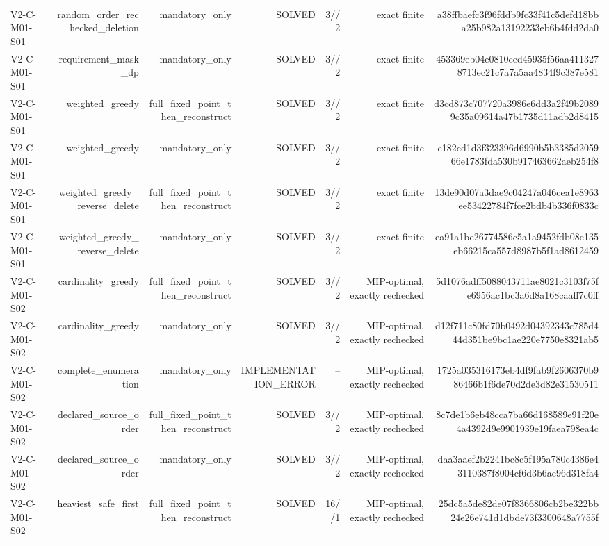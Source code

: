 {\begin{longtable}{lrrrrrr}
V2-C-M01-S01 & random\_order\_rechecked\_deletion & mandatory\_only & SOLVED & 3//2 & exact finite & a38ffbaefc3f96fddb9fc33f41c5defd18bba25b982a13192233eb6b4fdd2da0 \\
V2-C-M01-S01 & requirement\_mask\_dp & mandatory\_only & SOLVED & 3//2 & exact finite & 453369eb04e0810ced45935f56aa4113278713ec21c7a7a5aa4834f9c387e581 \\
V2-C-M01-S01 & weighted\_greedy & full\_fixed\_point\_then\_reconstruct & SOLVED & 3//2 & exact finite & d3cd873c707720a3986e6dd3a2f49b20899c35a09614a47b1735d11adb2d8415 \\
V2-C-M01-S01 & weighted\_greedy & mandatory\_only & SOLVED & 3//2 & exact finite & e182cd1d3f323396d6990b5b3385d205966e1783fda530b917463662aeb254f8 \\
V2-C-M01-S01 & weighted\_greedy\_reverse\_delete & full\_fixed\_point\_then\_reconstruct & SOLVED & 3//2 & exact finite & 13de90d07a3dae9c04247a046cea1e8963ee53422784f7fce2bdb4b336f0833c \\
V2-C-M01-S01 & weighted\_greedy\_reverse\_delete & mandatory\_only & SOLVED & 3//2 & exact finite & ea91a1be26774586c5a1a9452fdb08e135eb66215ca557d8987b5f1ad8612459 \\
V2-C-M01-S02 & cardinality\_greedy & full\_fixed\_point\_then\_reconstruct & SOLVED & 3//2 & MIP-optimal, exactly rechecked & 5d1076adff5088043711ae8021c3103f75fe6956ac1bc3a6d8a168caaff7c0ff \\
V2-C-M01-S02 & cardinality\_greedy & mandatory\_only & SOLVED & 3//2 & MIP-optimal, exactly rechecked & d12f711c80fd70b0492d04392343c785d444d351be9bc1ae220e7750e8321ab5 \\
V2-C-M01-S02 & complete\_enumeration & mandatory\_only & IMPLEMENTATION\_ERROR & -- & MIP-optimal, exactly rechecked & 1725a035316173eb4df9fab9f2606370b986466b1f6de70d2de3d82e31530511 \\
V2-C-M01-S02 & declared\_source\_order & full\_fixed\_point\_then\_reconstruct & SOLVED & 3//2 & MIP-optimal, exactly rechecked & 8c7de1b6eb48cca7ba66d168589e91f20e4a4392d9e9901939e19faea798ea4c \\
V2-C-M01-S02 & declared\_source\_order & mandatory\_only & SOLVED & 3//2 & MIP-optimal, exactly rechecked & daa3aaef2b2241bc8c5f195a780c4386e43110387f8004cf6d3b6ae96d318fa4 \\
V2-C-M01-S02 & heaviest\_safe\_first & full\_fixed\_point\_then\_reconstruct & SOLVED & 16//1 & MIP-optimal, exactly rechecked & 25dc5a5de82de07f8366806cb2be322bb24e26e741d1dbde73f3300648a7755f \\

\end{longtable}}
